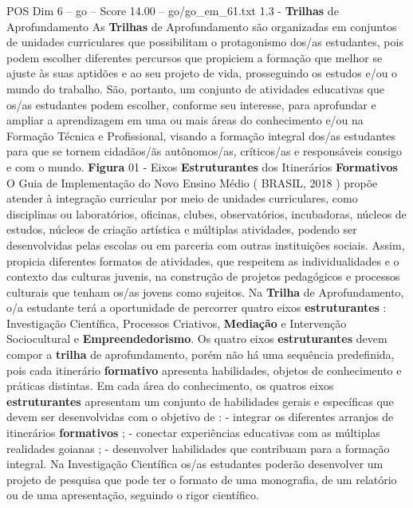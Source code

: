 \begin{textsample}{POS Dim 6 – go – Score 14.00 – go/go\_em\_61.txt}  \label{ex:f6_pos_111}
1.3 - \textbf{Trilhas} de Aprofundamento As \textbf{Trilhas} de Aprofundamento são organizadas em conjuntos de unidades curriculares que possibilitam o protagonismo dos/as estudantes, pois podem escolher diferentes percursos que propiciem a formação que melhor se ajuste às suas aptidões e ao seu projeto de vida, prosseguindo os estudos e/ou o mundo do trabalho.
São, portanto, um conjunto de atividades educativas que os/as estudantes podem escolher, conforme seu interesse, para aprofundar e ampliar a aprendizagem em uma ou mais áreas do conhecimento e/ou na Formação Técnica e Profissional, visando a formação integral dos/as estudantes para que se tornem cidadãos/ãs autônomos/as, críticos/as e responsáveis consigo e com o mundo. \textbf{Figura} 01 - Eixos \textbf{Estruturantes} dos Itinerários \textbf{Formativos} O Guia de Implementação do Novo Ensino Médio ( BRASIL, 2018 ) propõe atender à integração curricular por meio de unidades curriculares, como disciplinas ou laboratórios, oficinas, clubes, observatórios, incubadoras, núcleos de estudos, núcleos de criação artística e múltiplas atividades, podendo ser desenvolvidas pelas escolas ou em parceria com outras instituições sociais.
Assim, propicia diferentes formatos de atividades, que respeitem as individualidades e o contexto das culturas juvenis, na construção de projetos pedagógicos e processos culturais que tenham os/as jovens como sujeitos.
Na \textbf{Trilha} de Aprofundamento, o/a estudante terá a oportunidade de percorrer quatro eixos \textbf{estruturantes} : Investigação Científica, Processos Criativos, \textbf{Mediação} e Intervenção Sociocultural e \textbf{Empreendedorismo}.
Os quatro eixos \textbf{estruturantes} devem compor a \textbf{trilha} de aprofundamento, porém não há uma sequência predefinida, pois cada itinerário \textbf{formativo} apresenta habilidades, objetos de conhecimento e práticas distintas.
Em cada área do conhecimento, os quatros eixos \textbf{estruturantes} apresentam um conjunto de habilidades gerais e específicas que devem ser desenvolvidas com o objetivo de : - integrar os diferentes arranjos de itinerários \textbf{formativos} ; - conectar experiências educativas com as múltiplas realidades goianas ; - desenvolver habilidades que contribuam para a formação integral.
Na Investigação Científica os/as estudantes poderão desenvolver um projeto de pesquisa que pode ter o formato de uma monografia, de um relatório ou de uma apresentação, seguindo o rigor científico.

\end{textsample}
